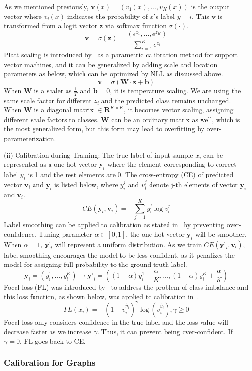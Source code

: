 As we mentioned previously, $\textbf{v}(x)=(v_1(x),...,v_K(x))$ is the output vector where $v_i(x)$ indicates the probability of $x$'s label $y=i$. This $\textbf{v}$ is transformed from a logit vector $\textbf{z}$ via softmax function $\sigma(\cdot)$.
\begin{equation}
    \textbf{v}=\sigma(\textbf{z})=\frac{( e^{z_1}, ..., e^{z_K})}{\sum_{i=1}^K e^{z_i}}
\end{equation}
Platt scaling is introduced by~\cite{platt1999probabilistic} as a parametric calibration method for support vector machines, and it can be generalized by adding scale and location parameters as below, which can be optimized by NLL as discussed above.
\begin{equation}
    \textbf{v}=\sigma(\textbf{W}\cdot\textbf{z}+\textbf{b})
\end{equation}
When $\textbf{W}$ is a scaler as $\frac{1}{T}$ and $\textbf{b}=0$, it is temperature scaling. We are using the same scale factor for different $z_i$ and the predicted class remains unchanged. When $\textbf{W}$ is a diagonal matrix $\in \mathbf{R}^{K\times K}$, it becomes vector scaling, assigning different scale factors to classes. $\textbf{W}$ can be an ordinary matrix as well, which is the most generalized form, but this form may lead to overfitting by over-parameterization.

(ii) Calibration during Training: The true label of input sample $x_i$ can be represented as a one-hot vector $\textbf{y}_i$ where the element corresponding to correct label $y_i$ is 1 and the rest elements are 0. The cross-entropy (CE) of predicted vector $\textbf{v}_i$ and $\textbf{y}_i$ is listed below, where $y_i^j$ and $v_i^j$ denote j-th elements of vector $\textbf{y}_{i}$ and $\textbf{v}_{i}$.
\begin{equation}
    CE(\textbf{y}_i,\textbf{v}_i)=-\sum_{j=1}^K y_i^j\log v_i^j
\end{equation}
Label smoothing can be applied to calibration as stated in~\cite{muller2019does} by preventing over-confidence. Tuning parameter $\alpha \in [0,1]$, the one-hot vector $\textbf{y}_i$ will be smoother. When $\alpha=1$, $\textbf{y'}_i$ will represent a uniform distribution. As we train $CE(\textbf{y'}_i,\textbf{v}_i)$, label smoothing encourages the model to be less confident, as it penalizes the model for assigning full probability to the ground truth label. 
\begin{equation}
    \textbf{y}_i=(y_i^1,...,y_i^K)\rightarrow\textbf{y'}_i=((1-\alpha)y_i^1+\frac{\alpha}{K},...,(1-\alpha)y_i^K+\frac{\alpha}{K})
\end{equation}
Focal loss (FL) was introduced by~\cite{lin2017focal} to address the problem of class imbalance and this loss function, as shown below, was applied to calibration in~\cite{mukhoti2020calibrating}. 
\begin{equation}
    FL(x_i)=-(1-v_i^{\hat{y}_i})^\gamma \log(v_i^{\hat{y}_i}), \gamma\geq 0
\end{equation}
Focal loss only considers confidence in the true label and the loss value will decrease faster as we increase $\gamma$. Thus, it can prevent being over-confident. If $\gamma=0$, FL goes back to CE.
\subsubsection{Calibration for Graphs}